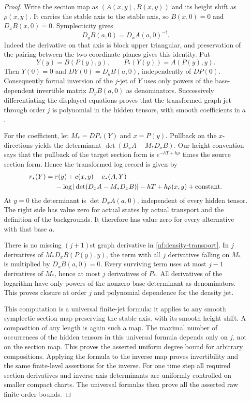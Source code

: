 \begin{proof}
Write the section map as $(A(x,y),B(x,y))$ and its height shift as
$\rho(x,y)$.  It carries the stable axis to the stable axis, so
$B(x,0)=0$ and $D_xB(x,0)=0$.  Symplecticity gives
\begin{equation}\label{nf:axis-derivative}
 D_yB(a,0)=D_xA(a,0)^{-t}.
\end{equation}
Indeed the derivative on that axis is block upper triangular, and
preservation of the pairing between the two coordinate planes gives
this identity.  Put
\[
 Y(y)=B(P(y),y),\qquad P_*(Y(y))=A(P(y),y).
\]
Then $Y(0)=0$ and $DY(0)=D_yB(a,0)$, independently of $DP(0)$.
Consequently formal inversion of the $j$-jet of $Y$ uses only powers
of the base-dependent invertible matrix $D_yB(a,0)$ as denominators.
Successively differentiating the displayed equations proves that
the transformed graph jet through order $j$ is polynomial in the
hidden tensors, with smooth coefficients in $a$.

For the coefficient, let $M_*=DP_*(Y)$ and $x=P(y)$.  Pullback on
the $x$-directions yields the determinant
$\det(D_xA-M_*D_xB)$.  Our height convention says that the pullback
of the target section form is $e^{-hT+h\rho}$ times the source
section form.  Hence the transformed log record is given by
\begin{align}
 r_*(Y)={}&r(y)+c(x,y)-c_*(A,Y)
 \label{nf:density-transport}\\
 &-\log|\det(D_xA-M_*D_xB)|-hT+h\rho(x,y)
       +\text{constant}.\notag
\end{align}
At $y=0$ the determinant is $\det D_xA(a,0)$, independent of every
hidden tensor.  The right side has value zero for actual states by
actual transport and the definition of the backgrounds.  It
therefore has value zero for every alternative with that base $a$.

There is no missing $(j+1)$st graph derivative in
\eqref{nf:density-transport}.  In $j$ derivatives of
$M_*D_xB(P(y),y)$, the term with all $j$ derivatives falling on
$M_*$ is multiplied by $D_xB(a,0)=0$.  Every surviving term uses
at most $j-1$ derivatives of $M_*$, hence at most $j$ derivatives
of $P_*$.  All derivatives of the logarithm have only powers of
the nonzero base determinant as denominators.  This proves closure
at order $j$ and polynomial dependence for the density jet.

This computation is a universal finite-jet formula: it applies to
any smooth symplectic section map preserving the stable axis, with
its smooth height shift.  A composition of any length is again such
a map.  The maximal number of occurrences of the hidden tensors in
this universal formula depends only on $j$, not on the section
map.  This proves the asserted uniform degree bound for arbitrary
compositions.  Applying the formula to the inverse map proves
invertibility and the same finite-level assertions for the inverse.
For one time step all required section derivatives and inverse
axis determinants are uniformly controlled on smaller compact
charts.  The universal formulas then prove all the asserted raw
finite-order bounds.


\end{proof}
